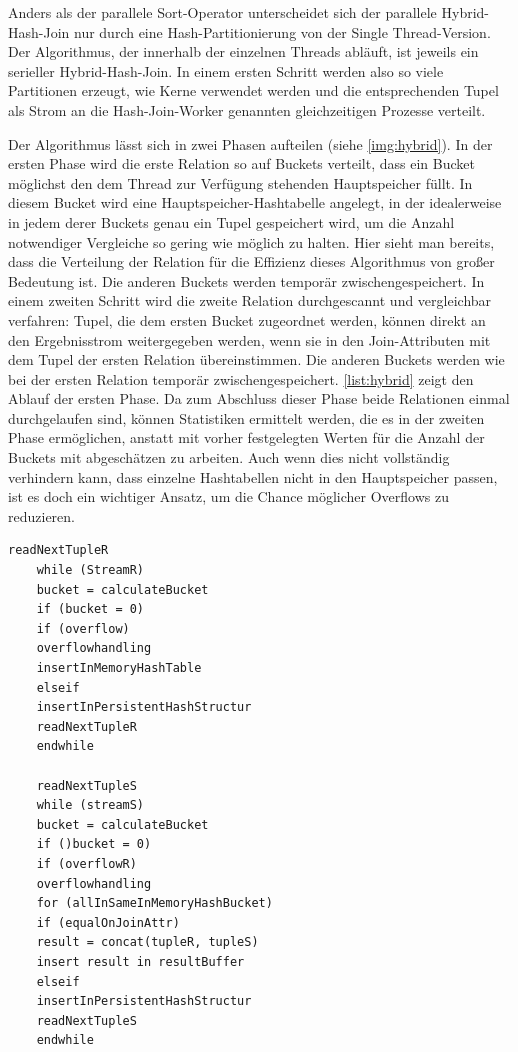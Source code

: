 \documentclass[a4paper,12pt,twoside]{article}
\begin{document}
{Anders als der parallele Sort-Operator unterscheidet sich der parallele Hybrid-Hash-Join nur durch eine Hash-Partitionierung von der Single Thread-Version. Der Algorithmus, der innerhalb der einzelnen Threads abläuft, ist jeweils ein serieller Hybrid-Hash-Join. In einem ersten Schritt werden also so viele Partitionen erzeugt, wie Kerne verwendet werden und die entsprechenden Tupel als Strom an die Hash-Join-Worker genannten gleichzeitigen Prozesse verteilt.

Der Algorithmus lässt sich in zwei Phasen aufteilen (siehe \autoref{img:hybrid}). In der ersten Phase wird die erste Relation so auf Buckets verteilt, dass ein Bucket möglichst den dem Thread zur Verfügung stehenden Hauptspeicher füllt. In diesem Bucket wird eine Hauptspeicher-Hashtabelle angelegt, in der idealerweise in jedem derer Buckets genau ein Tupel gespeichert wird, um die Anzahl notwendiger Vergleiche so gering wie möglich zu halten. Hier sieht man bereits, dass die Verteilung der Relation für die Effizienz dieses Algorithmus von großer Bedeutung ist. Die anderen Buckets werden temporär zwischengespeichert. In einem zweiten Schritt wird die zweite Relation durchgescannt und vergleichbar verfahren: Tupel, die dem ersten Bucket zugeordnet werden, können direkt an den Ergebnisstrom weitergegeben werden, wenn sie in den Join-Attributen mit dem Tupel der ersten Relation übereinstimmen. Die anderen Buckets werden wie bei der ersten Relation temporär zwischengespeichert. \autoref{list:hybrid} zeigt den Ablauf der ersten Phase. Da zum Abschluss dieser Phase beide Relationen einmal durchgelaufen sind, können Statistiken ermittelt werden, die es in der zweiten Phase ermöglichen, anstatt mit vorher festgelegten Werten für die Anzahl der Buckets mit abgeschätzen zu arbeiten. Auch wenn dies nicht vollständig verhindern kann, dass einzelne Hashtabellen nicht in den Hauptspeicher passen, ist es doch ein wichtiger Ansatz, um die Chance möglicher Overflows zu reduzieren.   

\begin{minipage}{\linewidth}
	\begin{lstlisting}[caption={Phase 1 Hybrid Hash Join}, label=list:hybrid] 
	readNextTupleR
	while (StreamR) 
	bucket = calculateBucket
	if (bucket = 0)
	if (overflow)
	overflowhandling
	insertInMemoryHashTable
	elseif
	insertInPersistentHashStructur
	readNextTupleR
	endwhile
	
	readNextTupleS
	while (streamS)
	bucket = calculateBucket
	if ()bucket = 0)
	if (overflowR)
	overflowhandling
	for (allInSameInMemoryHashBucket)
	if (equalOnJoinAttr)
	result = concat(tupleR, tupleS)
	insert result in resultBuffer
	elseif
	insertInPersistentHashStructur
	readNextTupleS
	endwhile
	\end{lstlisting}
\end{minipage}

}
\end{document}
